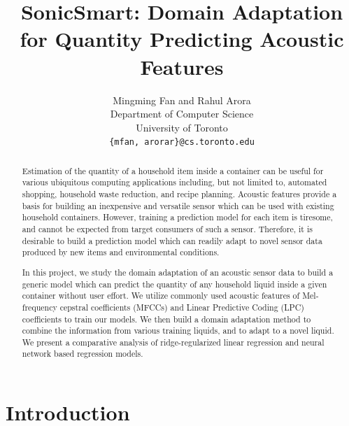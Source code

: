 \documentclass{article} %
\title{SonicSmart: Domain Adaptation for Quantity Predicting Acoustic Features}
\author{
Mingming Fan and Rahul Arora\\
Department of Computer Science\\
University of Toronto\\
\texttt{\{mfan, arorar\}@cs.toronto.edu}
}
\begin{document}
\maketitle

\begin{abstract}
Estimation of the quantity of a household item inside a container can be useful for various ubiquitous computing applications including, but not limited to, automated shopping, household waste reduction, and recipe planning.
Acoustic features provide a basis for building an inexpensive and versatile sensor which can be used with existing household containers.
However, training a prediction model for each item is tiresome, and cannot be expected from target consumers of such a sensor.
Therefore, it is desirable to build a prediction model which can readily adapt to novel sensor data produced by new items and environmental conditions.

In this project, we study the domain adaptation of an acoustic sensor data to build a generic model which can predict the quantity of any household liquid inside a given container without user effort.
We utilize commonly used acoustic features of Mel-frequency cepstral coefficients (MFCCs) and Linear Predictive Coding (LPC) coefficients to train our models.
We then build a domain adaptation method to combine the information from various training liquids, and to adapt to a novel liquid.
We present a comparative analysis of ridge-regularized linear regression and neural network based regression models.
\end{abstract}

\section{Introduction}
\label{sec:introduction}


\end{document}
